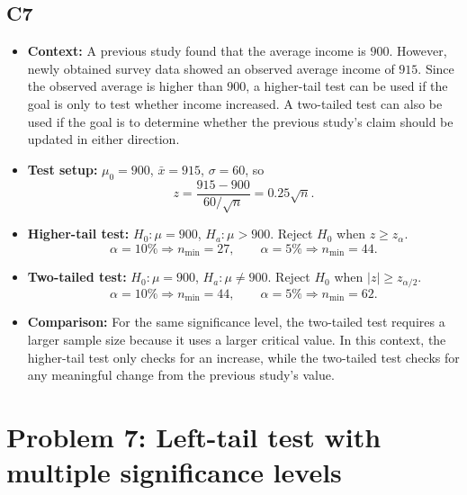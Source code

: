 \subsection*{C7}
\begin{itemize}
	\item \textbf{Context:} A previous study found that the average income is \(900\). However, newly obtained survey data showed an observed average income of \(915\). Since the observed average is higher than \(900\), a higher-tail test can be used if the goal is only to test whether income increased. A two-tailed test can also be used if the goal is to determine whether the previous study's claim should be updated in either direction.
	\item \textbf{Test setup:} \(\mu_0=900\), \(\bar x=915\), \(\sigma=60\), so
	\[
	z=\frac{915-900}{60/\sqrt n}=0.25\sqrt n.
	\]
	\item \textbf{Higher-tail test:} \(H_0:\mu=900\), \(H_a:\mu>900\). Reject \(H_0\) when \(z\ge z_{\alpha}\).
	\[
	\alpha=10\%\Rightarrow n_{\min}=27,
	\qquad
	\alpha=5\%\Rightarrow n_{\min}=44.
	\]
	\item \textbf{Two-tailed test:} \(H_0:\mu=900\), \(H_a:\mu\ne900\). Reject \(H_0\) when \(|z|\ge z_{\alpha/2}\).
	\[
	\alpha=10\%\Rightarrow n_{\min}=44,
	\qquad
	\alpha=5\%\Rightarrow n_{\min}=62.
	\]
	\item \textbf{Comparison:} For the same significance level, the two-tailed test requires a larger sample size because it uses a larger critical value. In this context, the higher-tail test only checks for an increase, while the two-tailed test checks for any meaningful change from the previous study's value.
\end{itemize}
\section{Problem 7: Left-tail test with multiple significance levels}
